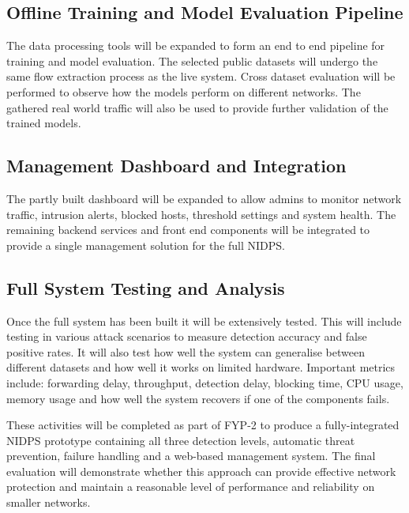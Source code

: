 \subsection{Offline Training and Model Evaluation Pipeline}\label{sec:10.2.4}

\noindent The data processing tools will be expanded to form an end to end pipeline for training and model evaluation. The selected public datasets will undergo the same flow extraction process as the live system. Cross dataset evaluation will be performed to observe how the models perform on different networks. The gathered real world traffic will also be used to provide further validation of the trained models.

\subsection{Management Dashboard and Integration}\label{sec:10.2.5}

\noindent The partly built dashboard will be expanded to allow admins to monitor network traffic, intrusion alerts, blocked hosts, threshold settings and system health. The remaining backend services and front end components will be integrated to provide a single management solution for the full NIDPS.

\subsection{Full System Testing and Analysis}\label{sec:10.2.6}

\noindent Once the full system has been built it will be extensively tested. This will include testing in various attack scenarios to measure detection accuracy and false positive rates. It will also test how well the system can generalise between different datasets and how well it works on limited hardware. Important metrics include: forwarding delay, throughput, detection delay, blocking time, CPU usage, memory usage and how well the system recovers if one of the components fails.

\noindent These activities will be completed as part of FYP-2 to produce a fully-integrated NIDPS prototype containing all three detection levels, automatic threat prevention, failure handling and a web-based management system. The final evaluation will demonstrate whether this approach can provide effective network protection and maintain a reasonable level of performance and reliability on smaller networks.

